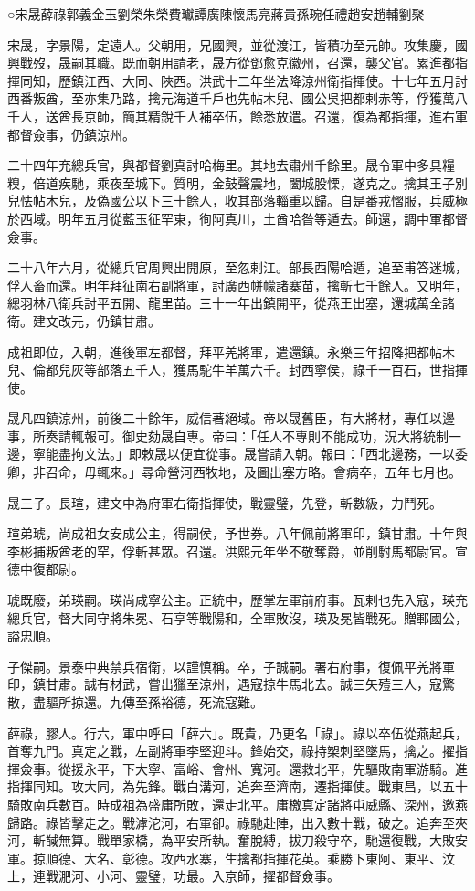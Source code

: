 
\begin{pinyinscope}
○宋晟薛祿郭義金玉劉榮朱榮費瓛譚廣陳懷馬亮蔣貴孫琬任禮趙安趙輔劉聚

宋晟，字景陽，定遠人。父朝用，兄國興，並從渡江，皆積功至元帥。攻集慶，國興戰歿，晟嗣其職。既而朝用請老，晟方從鄧愈克徽州，召還，襲父官。累進都指揮同知，歷鎮江西、大同、陜西。洪武十二年坐法降涼州衛指揮使。十七年五月討西番叛酋，至亦集乃路，擒元海道千戶也先帖木兒、國公吳把都剌赤等，俘獲萬八千人，送酋長京師，簡其精銳千人補卒伍，餘悉放遣。召還，復為都指揮，進右軍都督僉事，仍鎮涼州。

二十四年充總兵官，與都督劉真討哈梅里。其地去肅州千餘里。晟令軍中多具糧糗，倍道疾馳，乘夜至城下。質明，金鼓聲震地，闔城股慄，遂克之。擒其王子別兒怯帖木兒，及偽國公以下三十餘人，收其部落輜重以歸。自是番戎慴服，兵威極於西域。明年五月從藍玉征罕東，徇阿真川，土酋哈昝等遁去。師還，調中軍都督僉事。

二十八年六月，從總兵官周興出開原，至忽剌江。部長西陽哈遁，追至甫答迷城，俘人畜而還。明年拜征南右副將軍，討廣西帡幪諸寨苗，擒斬七千餘人。又明年，總羽林八衛兵討平五開、龍里苗。三十一年出鎮開平，從燕王出塞，還城萬全諸衛。建文改元，仍鎮甘肅。

成祖即位，入朝，進後軍左都督，拜平羌將軍，遣還鎮。永樂三年招降把都帖木兒、倫都兒灰等部落五千人，獲馬駝牛羊萬六千。封西寧侯，祿千一百石，世指揮使。

晟凡四鎮涼州，前後二十餘年，威信著絕域。帝以晟舊臣，有大將材，專任以邊事，所奏請輒報可。御史劾晟自專。帝曰：「任人不專則不能成功，況大將統制一邊，寧能盡拘文法。」即敕晟以便宜從事。晟嘗請入朝。報曰：「西北邊務，一以委卿，非召命，毋輒來。」尋命營河西牧地，及圖出塞方略。會病卒，五年七月也。

晟三子。長瑄，建文中為府軍右衛指揮使，戰靈璧，先登，斬數級，力鬥死。

瑄弟琥，尚成祖女安成公主，得嗣侯，予世券。八年佩前將軍印，鎮甘肅。十年與李彬捕叛酋老的罕，俘斬甚眾。召還。洪熙元年坐不敬奪爵，並削駙馬都尉官。宣德中復都尉。

琥既廢，弟瑛嗣。瑛尚咸寧公主。正統中，歷掌左軍前府事。瓦剌也先入寇，瑛充總兵官，督大同守將朱冕、石亨等戰陽和，全軍敗沒，瑛及冕皆戰死。贈鄆國公，謚忠順。

子傑嗣。景泰中典禁兵宿衛，以謹慎稱。卒，子誠嗣。署右府事，復佩平羌將軍印，鎮甘肅。誠有材武，嘗出獵至涼州，遇寇掠牛馬北去。誠三矢殪三人，寇驚散，盡驅所掠還。九傳至孫裕德，死流寇難。

薛祿，膠人。行六，軍中呼曰「薛六」。既貴，乃更名「祿」。祿以卒伍從燕起兵，首奪九門。真定之戰，左副將軍李堅迎斗。鋒始交，祿持槊刺堅墜馬，擒之。擢指揮僉事。從援永平，下大寧、富峪、會州、寬河。還救北平，先驅敗南軍游騎。進指揮同知。攻大同，為先鋒。戰白溝河，追奔至濟南，遷指揮使。戰東昌，以五十騎敗南兵數百。時成祖為盛庸所敗，還走北平。庸檄真定諸將屯威縣、深州，邀燕歸路。祿皆擊走之。戰滹沱河，右軍卻。祿馳赴陣，出入數十戰，破之。追奔至夾河，斬馘無算。戰單家橋，為平安所執。奮脫縛，拔刀殺守卒，馳還復戰，大敗安軍。掠順德、大名、彰德。攻西水寨，生擒都指揮花英。乘勝下東阿、東平、汶上，連戰淝河、小河、靈璧，功最。入京師，擢都督僉事。


\end{pinyinscope}
